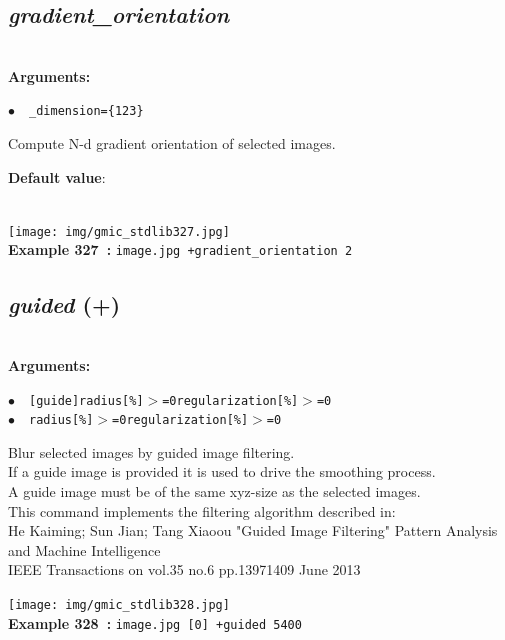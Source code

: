 \documentclass[a4paper,10.5pt,twoside]{book}
\def\comma{\discretionary{,}{}{,}}
\newcommand{\Cb}[1]{\textcolor{cb}{#1}}
\newcommand{\Cc}[1]{\textcolor{cc}{#1}}
\begin{document}
\subsection{\emph{gradient\_orientation} }\vspace*{-0.7em}
~\\\textbf{\Cb{Arguments: }}\begin{flushleft}
{\small \Cb{\hspace*{0.5cm}$\bullet$~~\texttt{\_dimension=\{1{\comma}2{\comma}3\}}}}\end{flushleft}
Compute N-d gradient orientation of selected images.
\begin{flushleft}\Cc{\textbf{Default value}:\\~\\\hspace*{0.5cm}{\small $\bullet$~~\texttt{'dimension=3'.}}}\end{flushleft}
\begin{center}\texttt{[image: img/gmic\_stdlib327.jpg]}\\
{\footnotesize \textbf{Example 327~:} \texttt{image.jpg +gradient\_orientation 2}}
\end{center}

\subsection{\emph{guided} (+)}\vspace*{-0.7em}
~\\\textbf{\Cb{Arguments: }}\begin{flushleft}
{\small \Cb{\hspace*{0.5cm}$\bullet$~~\texttt{[guide]{\comma}radius[\%]$>$=0{\comma}regularization[\%]$>$=0}}}~~~\\
{\small \Cb{\hspace*{0.5cm}$\bullet$~~\texttt{radius[\%]$>$=0{\comma}regularization[\%]$>$=0}}}\end{flushleft}
Blur selected images by guided image filtering.
~\\If a guide image is provided{\comma} it is used to drive the smoothing process.
~\\A guide image must be of the same xyz-size as the selected images.
~\\This command implements the filtering algorithm described in:
~\\He{\comma} Kaiming; Sun{\comma} Jian; Tang{\comma} Xiaoou{\comma} "Guided Image Filtering{\comma}" Pattern Analysis and Machine Intelligence{\comma}
~\\IEEE Transactions on {\comma} vol.35{\comma} no.6{\comma} pp.1397{\comma}1409{\comma} June 2013
\begin{center}\texttt{[image: img/gmic\_stdlib328.jpg]}\\
{\footnotesize \textbf{Example 328~:} \texttt{image.jpg [0] +guided 5{\comma}400}}
\end{center}
\end{document}

